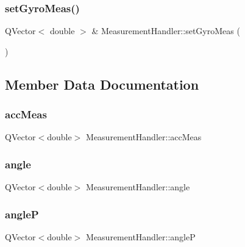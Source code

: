 \mbox{\label{class_measurement_handler_a56f38156d0bcbe80fe7a4f07f7df8c04}} 
\subsubsection{set\+Gyro\+Meas()}
{\footnotesize\ttfamily Q\+Vector$<$ double $>$ \& Measurement\+Handler\+::set\+Gyro\+Meas (\begin{DoxyParamCaption}{ }\end{DoxyParamCaption})}



\subsection{Member Data Documentation}
\mbox{\label{class_measurement_handler_abc15cc3967c7aad564b8b6b5101b9123}} 
\subsubsection{acc\+Meas}
{\footnotesize\ttfamily Q\+Vector$<$double$>$ Measurement\+Handler\+::acc\+Meas\hspace{0.3cm}{\ttfamily [private]}}

\mbox{\label{class_measurement_handler_a5107fd78f0e0b98517fb75d1fc5af906}} 
\subsubsection{angle}
{\footnotesize\ttfamily Q\+Vector$<$double$>$ Measurement\+Handler\+::angle\hspace{0.3cm}{\ttfamily [private]}}

\mbox{\label{class_measurement_handler_a4e1ab2116fcc94b5c6f03ede6c814176}} 
\subsubsection{angleP}
{\footnotesize\ttfamily Q\+Vector$<$double$>$ Measurement\+Handler\+::angleP\hspace{0.3cm}{\ttfamily [private]}}

